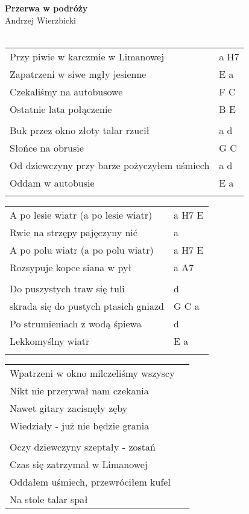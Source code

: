 \documentclass[a5paper]{article}
\begin{document}


\noindent
\fontsize{12pt}{15pt}\selectfont
\textbf{Przerwa w podróży} \\
\fontsize{8pt}{10pt}\selectfont
Andrzej Wierzbicki \\ \\
\fontsize{10pt}{12pt}\selectfont
{}
\begin{tabular}{@{}p{8.50cm}p{3cm}@{}}
\noindent
Przy piwie w karczmie w Limanowej & a H7 \\
Zapatrzeni w siwe mgły jesienne	& E a \\
Czekaliśmy na autobusowe & F C \\
Ostatnie lata połączenie & B E \\ \\
Buk przez okno złoty talar rzucił & a d \\
Słońce na obrusie & G C \\
Od dziewczyny przy barze pożyczyłem uśmiech & a d \\
Oddam w autobusie & E a \\ \\
\end{tabular}

\noindent
\begin{tabular}{@{}p{7.50cm}p{3cm}@{}}
A po lesie wiatr (a po lesie wiatr) & a H7 E \\
Rwie na strzępy pajęczyny nić & a \\
A po polu wiatr (a po polu wiatr) & a H7 E \\
Rozsypuje kopce siana w pył & a A7 \\ \\
Do puszystych traw się tuli & d \\
skrada się do pustych ptasich gniazd & G C a \\
Po strumieniach z wodą śpiewa & d \\
Lekkomyślny wiatr & E a \\ \\
\end{tabular}

\noindent
\begin{tabular}{@{}p{7.50cm}p{3cm}@{}}
Wpatrzeni w okno milczeliśmy wszyscy \\
Nikt nie przerywał nam czekania \\
Nawet gitary zacisnęły zęby \\
Wiedziały - już nie będzie grania \\ \\
Oczy dziewczyny szeptały - zostań \\
Czas się zatrzymał w Limanowej \\
Oddałem uśmiech, przewróciłem kufel \\
Na stole talar spał
\end{tabular}
\end{document}
